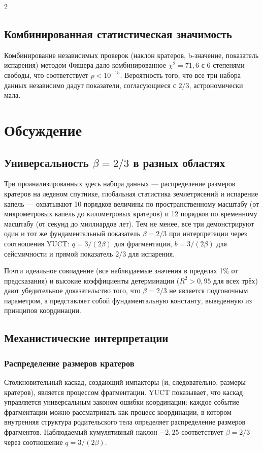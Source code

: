 \documentclass[11pt,a4paper]{article}
\newcommand{\betaf}{\beta}
\begin{document}
\begin{multicols}{2}
		\subsection{Комбинированная статистическая значимость}
		
		Комбинирование независимых проверок (наклон кратеров, b-значение, показатель испарения) методом Фишера дало комбинированное \(\chi^2 = 71,6\) с 6 степенями свободы, что соответствует \(p < 10^{-15}\). Вероятность того, что все три набора данных независимо дадут показатели, согласующиеся с \(2/3\), астрономически мала.
		
		\section{Обсуждение}
		
		\subsection{Универсальность \(\betaf = 2/3\) в разных областях}
		
		Три проанализированных здесь набора данных — распределение размеров кратеров на ледяном спутнике, глобальная статистика землетрясений и испарение капель — охватывают 10 порядков величины по пространственному масштабу (от микрометровых капель до километровых кратеров) и 12 порядков по временному масштабу (от секунд до миллиардов лет). Тем не менее, все три демонстрируют один и тот же фундаментальный показатель \(\betaf = 2/3\) при интерпретации через соотношения YUCT: \(q = 3/(2\betaf)\) для фрагментации, \(b = 3/(2\betaf)\) для сейсмичности и прямой показатель \(2/3\) для испарения.
		
		Почти идеальное совпадение (все наблюдаемые значения в пределах 1\% от предсказания) и высокие коэффициенты детерминации (\(R^2 > 0,95\) для всех трёх) дают убедительное доказательство того, что \(\betaf = 2/3\) не является подгоночным параметром, а представляет собой фундаментальную константу, выведенную из принципов координации.
		
		\subsection{Механистические интерпретации}
		
		\subsubsection{Распределение размеров кратеров}
		Столкновительный каскад, создающий импакторы (и, следовательно, размеры кратеров), является процессом фрагментации. YUCT показывает, что каскад управляется универсальным законом ошибки координации: каждое событие фрагментации можно рассматривать как процесс координации, в котором внутренняя структура родительского тела определяет распределение размеров фрагментов. Наблюдаемый кумулятивный наклон \(-2,25\) соответствует \(\betaf = 2/3\) через соотношение \(q = 3/(2\betaf)\).
		

\end{multicols}
\end{document}
